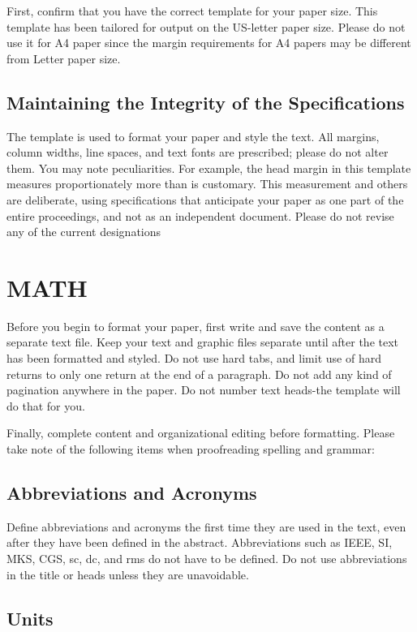 \documentclass[letterpaper, 10 pt, conference]{ieeeconf}  %
\begin{document}
	First, confirm that you have the correct template for your paper size. This template has been tailored for output on the US-letter paper size. Please do not use it for A4 paper since the margin requirements for A4 papers may be different from Letter paper size.
	
	\subsection{Maintaining the Integrity of the Specifications}
	
	The template is used to format your paper and style the text. All margins, column widths, line spaces, and text fonts are prescribed; please do not alter them. You may note peculiarities. For example, the head margin in this template measures proportionately more than is customary. This measurement and others are deliberate, using specifications that anticipate your paper as one part of the entire proceedings, and not as an independent document. Please do not revise any of the current designations
	
	\section{MATH}
	
	Before you begin to format your paper, first write and save the content as a separate text file. Keep your text and graphic files separate until after the text has been formatted and styled. Do not use hard tabs, and limit use of hard returns to only one return at the end of a paragraph. Do not add any kind of pagination anywhere in the paper. Do not number text heads-the template will do that for you.
	
	Finally, complete content and organizational editing before formatting. Please take note of the following items when proofreading spelling and grammar:
	
	\subsection{Abbreviations and Acronyms} Define abbreviations and acronyms the first time they are used in the text, even after they have been defined in the abstract. Abbreviations such as IEEE, SI, MKS, CGS, sc, dc, and rms do not have to be defined. Do not use abbreviations in the title or heads unless they are unavoidable.
	
	\subsection{Units}
	
\end{document}
